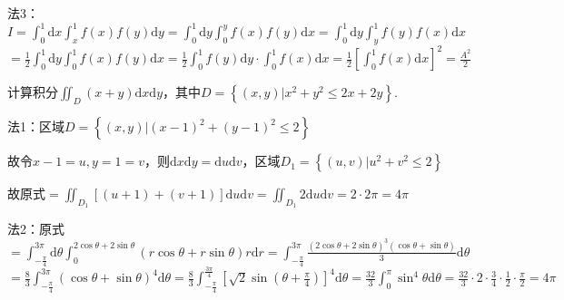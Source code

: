 \begin{xiti}
\begin{solution}
		法3：$I=\int_{0}^{1} \mathrm{d} x \int_{x}^{1} f(x) f(y) \mathrm{d} y=\int_{0}^{1} \mathrm{d} y \int_{0}^{y} f(x) f(y) \mathrm{d} x=\int_{0}^{1} \mathrm{d} y \int_{y}^{1} f(y) f(x) \mathrm{d} x$
		\\$=\frac{1}{2} \int_{0}^{1} \mathrm{d} y \int_{0}^{1} f(x) f(y) \mathrm{d} x=\frac{1}{2} \int_{0}^{1} f(y) \mathrm{d} y \cdot \int_{0}^{1} f(x) \mathrm{d} x=\frac{1}{2}\left[\int_{0}^{1} f(x) \mathrm{d} x\right]^{2}=\frac{A^{2}}{2}$
	\end{solution}
	\item 计算积分$\iint_{D}(x+y) \mathrm{d} x \mathrm{d}y$，其中$D=\left\{(x, y) | x^{2}+y^{2} \leqslant 2 x+2 y\right\}$.
	\begin{solution}
		法1：区域$D=\left\{(x, y) |(x-1)^{2}+(y-1)^{2} \leq 2\right\}$
		
		故令$x-1=u, y=1=v$，则$\mathrm{d} x \mathrm{d} y=\mathrm{d} u \mathrm{d} v$，区域$D_{1}=\left\{(u, v) | u^{2}+v^{2} \leq 2\right\}$
		
		故原式$=\iint_{D_{1}}[(u+1)+(v+1)] \mathrm{d} u \mathrm{d} v=\iint_{D_{1}} 2 \mathrm{d} u \mathrm{d} v=2 \cdot 2 \pi=4 \pi$
		
		法2：原式$=\int_{-\frac{\pi}{4}}^{3 \pi} \mathrm{d} \theta \int_{0}^{2 \cos \theta+2 \sin \theta}(r \cos \theta+r \sin \theta) r \mathrm{d} r=\int_{-\frac{\pi}{4}}^{3 \pi} \frac{(2 \cos \theta+2 \sin \theta)^{3}(\cos \theta+\sin \theta)}{3} \mathrm{d} \theta$
		$=\frac{8}{3} \int_{-\frac{\pi}{4}}^{3 \pi}(\cos \theta+\sin \theta)^{4} \mathrm{d} \theta=\frac{8}{3} \int_{-\frac{\pi}{4}}^{\frac{3 \pi}{4}}\left[\sqrt{2} \sin \left(\theta+\frac{\pi}{4}\right)\right]^{4} \mathrm{d} \theta=\frac{32}{3} \int_{0}^{\pi} \sin ^{4} \theta \mathrm{d} \theta=\frac{32}{3} \cdot 2 \cdot \frac{3}{4} \cdot \frac{1}{2} \cdot \frac{\pi}{2}=4 \pi$
		

\end{solution}
\end{xiti}
